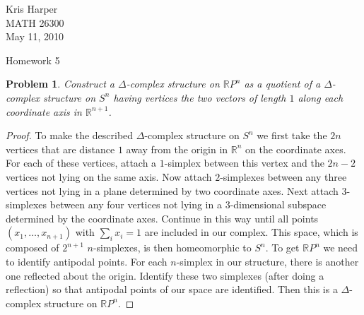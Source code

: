 \documentclass{article}
\newtheorem{problem}{Problem}
\begin{document}
\begin{flushright}
Kris Harper\\

MATH 26300\\

May 11, 2010
\end{flushright}

\begin{center}
Homework 5
\end{center}

\begin{problem}
Construct a $\Delta$-complex structure on $\mathbb{R}P^n$ as a quotient of a $\Delta$-complex structure on $S^n$ having vertices the two vectors of length $1$ along each coordinate axis in $\mathbb{R}^{n+1}$.
\end{problem}
\begin{proof}
To make the described $\Delta$-complex structure on $S^n$ we first take the $2n$ vertices that are distance $1$ away from the origin in $\mathbb{R}^n$ on the coordinate axes. For each of these vertices, attach a $1$-simplex between this vertex and the $2n-2$ vertices not lying on the same axis. Now attach $2$-simplexes between any three vertices not lying in a plane determined by two coordinate axes.
\vspace{100pt}
Next attach $3$-simplexes between any four vertices not lying in a $3$-dimensional subspace determined by the coordinate axes. Continue in this way until all points $(x_1, \dots , x_{n+1})$ with $\sum_i x_i = 1$ are included in our complex. This space, which is composed of $2^{n+1}$ $n$-simplexes, is then homeomorphic to $S^n$. To get $\mathbb{R}P^n$ we need to identify antipodal points. For each $n$-simplex in our structure, there is another one reflected about the origin. Identify these two simplexes (after doing a reflection) so that antipodal points of our space are identified. Then this is a $\Delta$-complex structure on $\mathbb{R}P^n$.
\end{proof}
\end{document}
